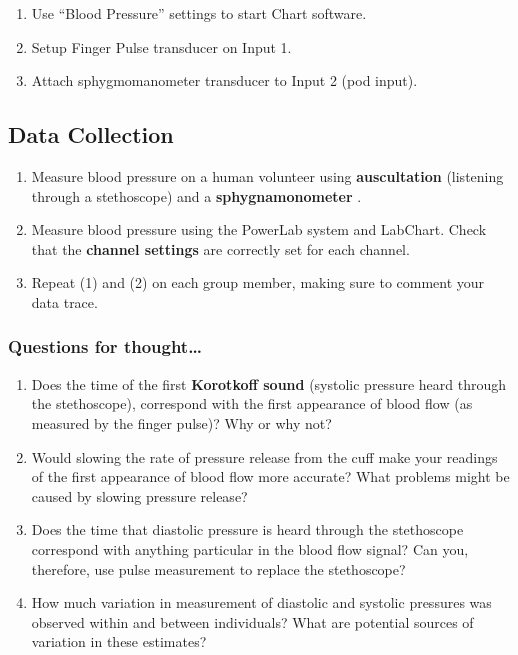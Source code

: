 \documentclass[
  letterpaper,
  DIV=11,
  numbers=noendperiod,
  oneside]{scrartcl}
\providecommand{\tightlist}{%
  \setlength{\itemsep}{0pt}\setlength{\parskip}{0pt}}\usepackage{longtable,booktabs,array}
\begin{document}
\begin{enumerate}
\def\labelenumi{\arabic{enumi}.}
\tightlist
\item
  Use ``Blood Pressure'' settings to start Chart software.
\item
  Setup Finger Pulse transducer on Input 1.
\item
  Attach sphygmomanometer transducer to Input 2 (pod input).
\end{enumerate}

\hypertarget{data-collection}{%
\subsection{Data Collection}\label{data-collection}}

\begin{enumerate}
\def\labelenumi{\arabic{enumi}.}
\tightlist
\item
  Measure blood pressure on a human volunteer using
  \textbf{auscultation} (listening through a stethoscope) and a
  \textbf{sphygnamonometer} .
\item
  Measure blood pressure using the PowerLab system and LabChart. Check
  that the \textbf{channel settings} are correctly set for each channel.
\item
  Repeat (1) and (2) on each group member, making sure to comment your
  data trace.
\end{enumerate}

\hypertarget{questions-for-thought}{%
\subsubsection{Questions for
thought\ldots{}}\label{questions-for-thought}}

\begin{enumerate}
\def\labelenumi{\arabic{enumi}.}
\tightlist
\item
  Does the time of the first \textbf{Korotkoff sound} (systolic pressure
  heard through the stethoscope), correspond with the first appearance
  of blood flow (as measured by the finger pulse)? Why or why not?
\item
  Would slowing the rate of pressure release from the cuff make your
  readings of the first appearance of blood flow more accurate? What
  problems might be caused by slowing pressure release?
\item
  Does the time that diastolic pressure is heard through the stethoscope
  correspond with anything particular in the blood flow signal? Can you,
  therefore, use pulse measurement to replace the stethoscope?
\item
  How much variation in measurement of diastolic and systolic pressures
  was observed within and between individuals? What are potential
  sources of variation in these estimates?
\end{enumerate}
\end{document}

